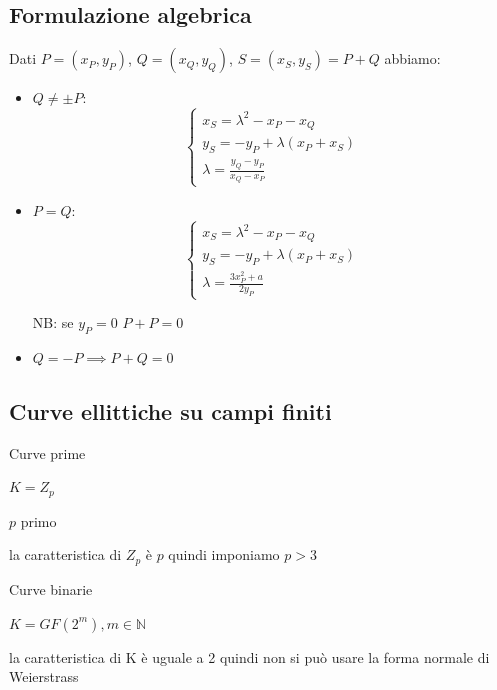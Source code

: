 \subsection{Formulazione algebrica}
Dati $P = (x_P, y_P)$, $Q = (x_Q, y_Q)$, $S = (x_S, y_S) = P+Q$ abbiamo:
\begin{itemize}
    \item $Q \neq \pm P$:
    \begin{equation}
        \begin{cases}
            x_S = \lambda^{2} - x_P - x_Q \\
            y_S = -y_P + \lambda(x_P + x_S) \\
            \lambda = \frac{y_Q - y_P}{x_Q - x_P}
        \end{cases}
    \end{equation}
    \item $P = Q$:
    \begin{equation}
        \begin{cases}
            x_S = \lambda^{2} - x_P - x_Q \\
            y_S = -y_P + \lambda(x_P + x_S) \\
            \lambda = \frac{3x_P^{2} + a}{2y_P}
        \end{cases}
    \end{equation}
    
    NB: se $y_P = 0$ $P+P=0$
    \item $Q = -P \implies P+Q = 0$
\end{itemize}

\subsection{Curve ellittiche su campi finiti}
\begin{minipage}{0.45\textwidth}
\centering
    Curve prime
    
    $K = Z_p$
    
    $p$ primo
    
    la caratteristica di $Z_p$ è $p$ quindi imponiamo $ p > 3 $
\end{minipage}
\hfill
\begin{minipage}{0.45\textwidth}
\centering
    Curve binarie
    
    $K = GF(2^m) , m \in \mathbb{N}$
    
    la caratteristica di K è uguale a 2 quindi non si può usare la forma normale di Weierstrass
\end{minipage}


